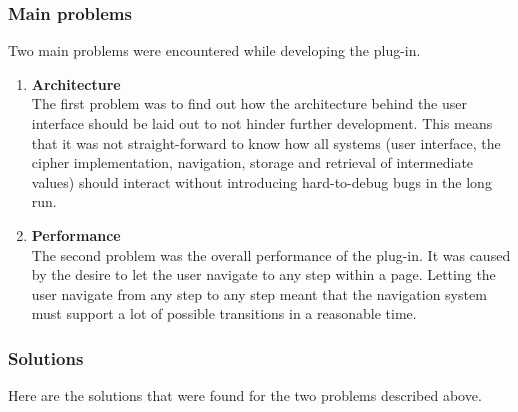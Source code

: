 \subsubsection{Main problems}

Two main problems were encountered while developing the plug-in.

\begin{enumerate}[label=(\labelenum{P}{{\arabic*}}), wide, labelwidth=!, labelindent=0pt]
\setlength{\parskip}{0pt}

\item \textbf{Architecture}\\
The first problem was to find out how the architecture behind the user interface should be laid out to not hinder further development. This means that it was not straight-forward to know how all systems (user interface, the cipher implementation, navigation, storage and retrieval of intermediate values) should interact without introducing hard-to-debug bugs in the long run.

\item \textbf{Performance}\\
The second problem was the overall performance of the plug-in. It was caused by the desire to let the user navigate to any step within a page. Letting the user navigate from any step to any step meant that the navigation system must support a lot of possible transitions in a reasonable time.

\end{enumerate}

\subsubsection{Solutions}

Here are the solutions that were found for the two problems described above.

